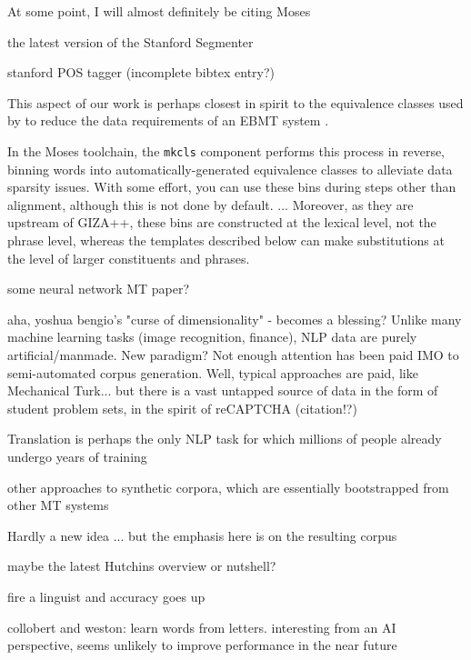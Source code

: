 At some point, I will almost definitely be citing Moses 

the latest version of the Stanford Segmenter 

stanford POS tagger (incomplete bibtex entry?) 

This aspect of our work is perhaps closest in spirit to the equivalence classes used by  to reduce the data requirements of an EBMT system .

In the Moses toolchain, the {\small \tt mkcls} component  performs this process in reverse, binning words into automatically-generated equivalence classes to alleviate data sparsity issues.
With some effort, you can use these bins during steps other than alignment, although this is not done by default.
...
Moreover, as they are upstream of GIZA++, these bins are constructed at the lexical level, not the phrase level, whereas the templates described below can make substitutions at the level of larger constituents and phrases.


some neural network MT paper?

aha, yoshua bengio's "curse of dimensionality" - becomes a blessing?  
Unlike many machine learning tasks (image recognition, finance), NLP data are purely artificial/manmade.  New paradigm?  Not enough attention has been paid IMO to semi-automated corpus generation.  Well, typical approaches are paid, like Mechanical Turk... but there is a vast untapped source of data in the form of student problem sets, in the spirit of reCAPTCHA (citation!?)

Translation is perhaps the only NLP task for which millions of people already undergo years of training

other approaches to synthetic corpora, which are essentially bootstrapped from other MT systems

Hardly a new idea ... but the emphasis here is on the resulting corpus




maybe the latest Hutchins overview or nutshell?

fire a linguist and accuracy goes up

collobert and weston: learn words from letters. interesting from an AI perspective, seems unlikely to improve performance in the near future

